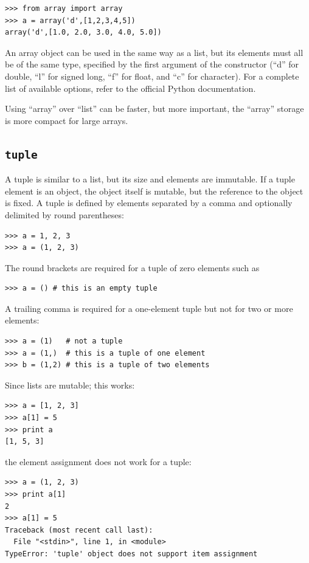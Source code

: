 \documentclass[justified,sixbynine]{tufte-book}
\def\ft{\small\tt}
\theoremstyle{plain}%
\theoremstyle{definition}
\theoremstyle{remark}
\begin{document}
\begin{fullwidth}
\begin{lstlisting}
>>> from array import array
>>> a = array('d',[1,2,3,4,5])
array('d',[1.0, 2.0, 3.0, 4.0, 5.0])
\end{lstlisting}

An array object can be used in the same way as a list, but its elements must all be of the same type, specified by the first argument of the constructor (``d'' for double, ``l'' for signed long, ``f'' for float, and ``c'' for character).  For a complete list of available options, refer to the official Python documentation.

Using ``array'' over ``list'' can be faster, but more important, the ``array'' storage is more compact for large arrays.

\goodbreak\subsection{{\ft tuple}}


A tuple is similar to a list, but its size and elements are immutable. If a tuple element is an object, the object itself is mutable, but the reference to the object is fixed. A tuple is defined by elements separated by a comma and optionally delimited by round parentheses:

\begin{lstlisting}
>>> a = 1, 2, 3
>>> a = (1, 2, 3)
\end{lstlisting}

The round brackets are required for a tuple of zero elements such as
\begin{lstlisting}
>>> a = () # this is an empty tuple
\end{lstlisting}

A trailing comma is required for a one-element tuple but not for two or more elements:
\begin{lstlisting}
>>> a = (1)   # not a tuple
>>> a = (1,)  # this is a tuple of one element
>>> b = (1,2) # this is a tuple of two elements
\end{lstlisting}

Since lists are mutable; this works:
\begin{lstlisting}
>>> a = [1, 2, 3]
>>> a[1] = 5
>>> print a
[1, 5, 3]
\end{lstlisting}
\noindent the element assignment does not work for a tuple:
\begin{lstlisting}
>>> a = (1, 2, 3)
>>> print a[1]
2
>>> a[1] = 5
Traceback (most recent call last):
  File "<stdin>", line 1, in <module>
TypeError: 'tuple' object does not support item assignment
\end{lstlisting}


\end{fullwidth}
\end{document}
